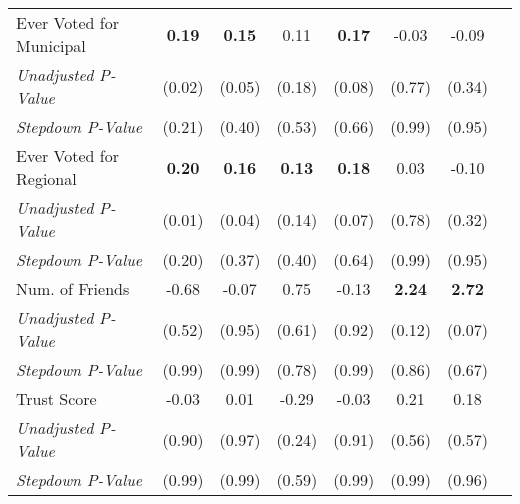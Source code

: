 \begin{tabular}{l c c c c c c c}
Ever Voted for Municipal & \textbf{ 0.19 } & \textbf{ 0.15 } & 0.11 & \textbf{ 0.17 } & -0.03 & -0.09 \\
\quad \textit{Unadjusted P-Value} & (0.02) & (0.05) & (0.18) & (0.08) & (0.77) & (0.34) \\
\quad \textit{Stepdown P-Value} & (0.21) & (0.40) & (0.53) & (0.66) & (0.99) & (0.95) \\
Ever Voted for Regional & \textbf{ 0.20 } & \textbf{ 0.16 } & \textbf{ 0.13 } & \textbf{ 0.18 } & 0.03 & -0.10 \\
\quad \textit{Unadjusted P-Value} & (0.01) & (0.04) & (0.14) & (0.07) & (0.78) & (0.32) \\
\quad \textit{Stepdown P-Value} & (0.20) & (0.37) & (0.40) & (0.64) & (0.99) & (0.95) \\
Num. of Friends & -0.68 & -0.07 & 0.75 & -0.13 & \textbf{ 2.24 } & \textbf{ 2.72 } \\
\quad \textit{Unadjusted P-Value} & (0.52) & (0.95) & (0.61) & (0.92) & (0.12) & (0.07) \\
\quad \textit{Stepdown P-Value} & (0.99) & (0.99) & (0.78) & (0.99) & (0.86) & (0.67) \\
Trust Score & -0.03 & 0.01 & -0.29 & -0.03 & 0.21 & 0.18 \\
\quad \textit{Unadjusted P-Value} & (0.90) & (0.97) & (0.24) & (0.91) & (0.56) & (0.57) \\
\quad \textit{Stepdown P-Value} & (0.99) & (0.99) & (0.59) & (0.99) & (0.99) & (0.96) \\
\bottomrule
\end{tabular}
